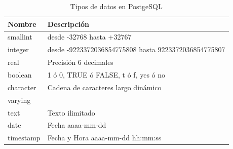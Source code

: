 \documentclass[letterpaper,12pt]{article}
\begin{document}
\begin{table}[!ht]
\caption{Tipos de datos en PostgeSQL}
\begin{center}
\begin{tabular}{|l|l|}
\hline
\textbf{Nombre} & \textbf{Descripción} \\ 
\hline
smallint & desde -32768 hasta +32767\\
\hline
integer & desde -9223372036854775808 hasta 9223372036854775807\\
\hline
real & Precisión 6 decimales\\
\hline
boolean & 1 ó 0, TRUE ó FALSE, t ó f, yes ó no\\
\hline
character & Cadena de caracteres largo dinámico\\
varying &\\
\hline
text & Texto ilimitado\\
\hline
date & Fecha aaaa-mm-dd\\
\hline
timestamp & Fecha y Hora aaaa-mm-dd hh:mm:ss\\
\hline

\end{tabular}
\end{center}
\end{table}

\newpage
\end{document}
